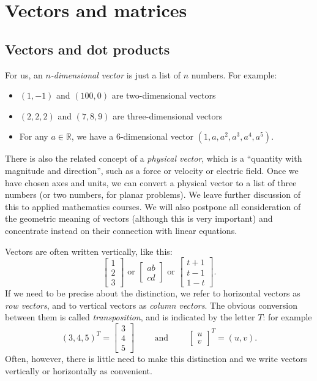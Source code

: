 \documentclass[a4paper]{book}
\newcommand{\PURPLE}[1]{{\color{purple}#1}}
\newcommand{\R}         {{\mathbb{R}}}
\newcommand{\bbm}       {\begin{bmatrix}}
\newcommand{\ebm}       {\end{bmatrix}}
\renewcommand{\:}{\colon}
\newcommand{\DEFN}[1]{\PURPLE{\emph{#1}}}
\theoremstyle{definition}
\begin{document}


\chapter{Vectors and matrices}
\label{chap-mat}

\section{Vectors and dot products}
\label{sec-vectors}

For us, an \DEFN{$n$-dimensional vector} is just a list of $n$
numbers.  For example:
\begin{itemize}
 \item $(1,-1)$ and $(100,0)$ are two-dimensional vectors
 \item $(2,2,2)$ and $(7,8,9)$ are three-dimensional vectors
 \item For any $a\in\R$, we have a $6$-dimensional vector
  $(1,a,a^2,a^3,a^4,a^5)$. 
\end{itemize}
There is also the related concept of a \DEFN{physical vector}, which
is a ``quantity with magnitude and direction'', such as a force or
velocity or electric field.  Once we have chosen axes and units, we
can convert a physical vector to a list of three numbers (or two
numbers, for planar problems).  We leave further discussion of this to
applied mathematics courses.  We will also postpone all consideration
of the geometric meaning of vectors (although this is very important)
and concentrate instead on their connection with linear equations.

Vectors are often written vertically, like this:
\[ \bbm 1 \\ 2 \\ 3 \ebm \text{ or }
   \bbm ab \\ cd \ebm \text{ or }
   \bbm t+1 \\ t-1 \\ 1-t \ebm.
\]
If we need to be precise about the distinction, we refer to horizontal
vectors as \DEFN{row vectors}, and to vertical vectors as \DEFN{column
  vectors}.  The obvious conversion between them is called
\DEFN{transposition}, and is indicated by the letter $T$: for example
\[ (3,4,5)^T = \bbm 3 \\ 4 \\ 5 \ebm
    \qquad \text{ and } \qquad
   \bbm u \\ v \ebm^T = (u,v).
\]
Often, however, there is little need to make this distinction and we
write vectors vertically or horizontally as convenient.
\end{document}
